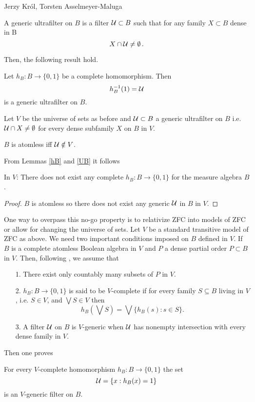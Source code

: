 \begin{artengenv2auth}{Jerzy Kr\'ol, Torsten Asselmeyer-Maluga}
\begin{Definition}
A generic ultrafilter on $B$ is a filter ${\cal U}\subset B$ such that for any family $X\subset B$ dense in B
\[X\cap {\cal U}\neq \emptyset \,.  \]
\end{Definition}
Then, the following result hold.
\begin{Lemma}\parencite[p.35]{Solovay1970}\label{hB}
Let $h_B:B\to \{0,1\}$ be a complete homomorphism. Then 
\[h_B^{-1}(1)= {\cal U} \] is a generic ultrafilter on $B$.
\end{Lemma}
Let $V$ be the universe of sets as before and ${\cal U}\subset B$ a generic ultrafilter on $B$ i.e. ${\cal U}\cap X\neq \emptyset$ for every dense subfamily $X$ on $B$ in $V$.
\begin{Lemma}\parencite[p.7]{Jech1986}\label{UB} $B$ is atomless iff ${\cal U} \notin V$.
\end{Lemma}
From Lemmas \ref{hB} and \ref{UB} it follows
\begin{Lemma}
In $V$: There does not exist any complete $h_B:B\to \{0,1\}$ for the measure algebra $B$.
\end{Lemma}
\begin{proof}$B$ is atomless so there does not exist any generic ${\cal U}$ in $B$ in $V$.\end{proof}
One way to overpass this no-go property is to relativize ZFC into models of ZFC or allow for changing the universe of sets. Let $V$ be a standard transitive model of ZFC as above. We need two important conditions imposed on $B$ defined in $V$. If $B$ is a complete atomless Boolean algebra in $V$ and $P$ a dense partial order $P\subset B$ in $V$. Then, following \parencite{Solovay1970}, we assume that
\begin{itemize}
    \item[1.] There exist only countably many subsets of $P$ in $V$.
    \item[2.] $h_B:B\to \{0,1\}$ is said to be $V$-complete if for every family $S\subseteq B$ living in $V$, i.e. $S\in V$, and $\bigvee S\in V$ then 
    \[ h_B(\bigvee S)=\bigvee\{h_B(s):s\in S \} .\]
    \item[3.] A filter ${\cal U}$ on $B$ is $V$-generic when ${\cal U}$ has nonempty intersection with every dense family in $V$.  
\end{itemize}
Then one proves
\begin{Lemma}\parencite[p.35]{Solovay1970}
For every $V$-complete homomorphism $h_B:B\to \{0,1\}$ the set 
\begin{equation}\label{hC} {\cal U}=\{x:h_B(x)=1\} \end{equation} is an $V$-generic filter on $B$.


\end{Lemma}
\end{artengenv2auth}
